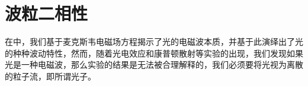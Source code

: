 \chapter{波粒二相性}
\label{chap:波粒二相性}
在中，我们基于麦克斯韦电磁场方程揭示了光的电磁波本质，并基于此演绎出了光的种种波动特性，然而，随着光电效应和康普顿散射等实验的出现，我们发现如果光是一种电磁波，那么实验的结果是无法被合理解释的，我们必须要将光视为离散的粒子流，即所谓光子。




